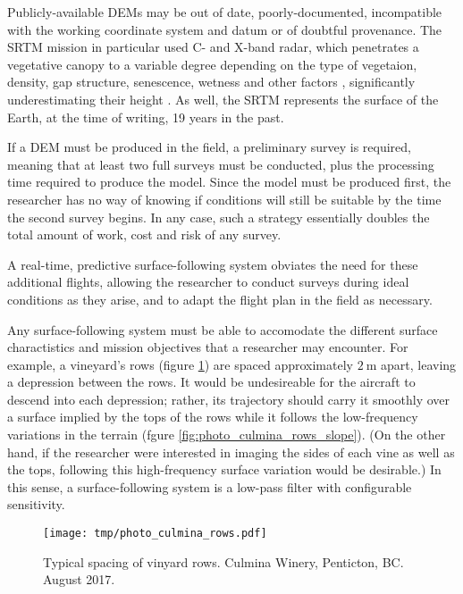 \documentclass[doc]{apa6}
\begin{document}
Publicly-available DEMs may be out of date, poorly-documented, incompatible with the working coordinate system and datum or of doubtful provenance. The SRTM mission in particular used C- and X-band radar, which penetrates a vegetative canopy to a variable degree depending on the type of vegetaion, density, gap structure, senescence, wetness and other factors \parencite{Miliaresis2009}, significantly underestimating their height \parencite{Sexton2009}. As well, the SRTM represents the surface of the Earth, at the time of writing, 19 years in the past. 

If a DEM must be produced in the field, a preliminary survey is required, meaning that at least two full surveys must be conducted, plus the processing time required to produce the model. Since the model must be produced first, the researcher has no way of knowing if conditions will still be suitable by the time the second survey begins. In any case, such a strategy essentially doubles the total amount of work, cost and risk of any survey. 

A real-time, predictive surface-following system obviates the need for these additional flights, allowing the researcher to conduct surveys during ideal conditions as they arise, and to adapt the flight plan in the field as necessary.

Any surface-following system must be able to accomodate the different surface charactistics and mission objectives that a researcher may encounter. For example, a vineyard's rows (figure \ref{fig:photo_culmina_rows}) are spaced approximately $\SI{2}\m$ apart, leaving a depression between the rows. It would be undesireable for the aircraft to descend into each depression; rather, its trajectory should carry it smoothly over a surface implied by the tops of the rows while it follows the low-frequency variations in the terrain (fgure \ref{fig:photo_culmina_rows_slope}). (On the other hand, if the researcher were interested in imaging the sides of each vine as well as the tops, following this high-frequency surface variation would be desirable.) In this sense, a surface-following system is a low-pass filter with configurable sensitivity. 

\begin{figure} %
\texttt{[image: tmp/photo\_culmina\_rows.pdf]} 
\caption{Typical spacing of vinyard rows. Culmina Winery, Penticton, BC. August 2017.}
\label{fig:photo_culmina_rows}
\end{figure}
\end{document}
